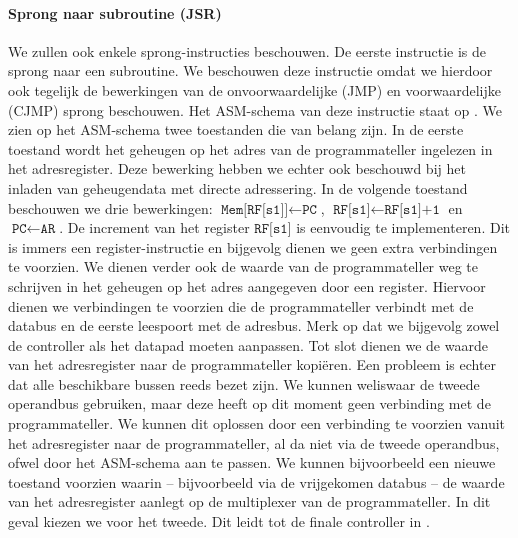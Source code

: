 \paragraph{Sprong naar subroutine (JSR)}
We zullen ook enkele sprong-instructies beschouwen. De eerste instructie is de sprong naar een subroutine. We beschouwen deze instructie omdat we hierdoor ook tegelijk de bewerkingen van de onvoorwaardelijke (JMP) en voorwaardelijke (CJMP) sprong beschouwen. Het ASM-schema van deze instructie staat op . We zien op het ASM-schema twee toestanden die van belang zijn. In de eerste toestand wordt het geheugen op het adres van de programmateller ingelezen in het adresregister. Deze bewerking hebben we echter ook beschouwd bij het inladen van geheugendata met directe adressering. In de volgende toestand beschouwen we drie bewerkingen: $\texttt{Mem[RF[s1]]}\leftarrow\texttt{PC}$, $\texttt{RF[s1]}\leftarrow\texttt{RF[s1]+1}$ en $\texttt{PC}\leftarrow\texttt{AR}$. De increment van het register $\texttt{RF[s1]}$ is eenvoudig te implementeren. Dit is immers een register-instructie en bijgevolg dienen we geen extra verbindingen te voorzien. We dienen verder ook de waarde van de programmateller weg te schrijven in het geheugen op het adres aangegeven door een register. Hiervoor dienen we verbindingen te voorzien die de programmateller verbindt met de databus en de eerste leespoort met de adresbus. Merk op dat we bijgevolg zowel de controller als het datapad moeten aanpassen. Tot slot dienen we de waarde van het adresregister naar de programmateller kopi\"eren. Een probleem is echter dat alle beschikbare bussen reeds bezet zijn. We kunnen weliswaar de tweede operandbus gebruiken, maar deze heeft op dit moment geen verbinding met de programmateller. We kunnen dit oplossen door een verbinding te voorzien vanuit het adresregister naar de programmateller, al da niet via de tweede operandbus, ofwel door het ASM-schema aan te passen. We kunnen bijvoorbeeld een nieuwe toestand voorzien waarin -- bijvoorbeeld via de vrijgekomen databus -- de waarde van het adresregister aanlegt op de multiplexer van de programmateller. In dit geval kiezen we voor het tweede. Dit leidt tot de finale controller in .
